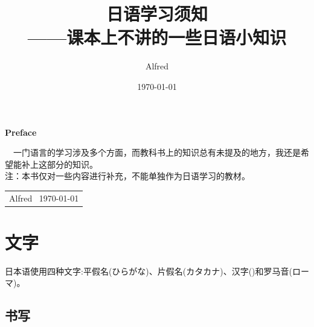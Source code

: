 \documentclass[12pt, a4paper, oneside]{book}
\title{{\Huge{\textbf{日语学习须知}}}\\——课本上不讲的一些日语小知识}
\author{Alfred}
\date{\today}
\newcommand{\jp}{\CJKfamily{zj}}
\begin{document}
\maketitle

\setcounter{page}{1}

\begin{center}
    \Huge\textbf{Preface}
\end{center}~\
一门语言的学习涉及多个方面，而教科书上的知识总有未提及的地方，我还是希望能补上这部分的知识。
\\ {\color{red} 注：本书仅对一些内容进行补充，不能单独作为日语学习的教材。}
~\
\begin{flushright}
    \begin{tabular}{c}
        Alfred \
        \today
    \end{tabular}
\end{flushright}

\newpage
{}
\setcounter{page}{1}
\tableofcontents
\newpage
\setcounter{page}{1}

\chapter{文字}
日本语使用四种文字:平假名(ひらがな)、片假名(カタカナ)、汉字({\jp {}})和罗马音({\jp ローマ})。
\section{书写}
\end{document}
